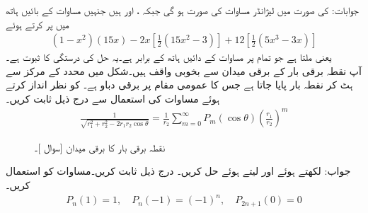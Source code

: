 جوابات: کی صورت میں لیژانڈر مساوات  کی صورت  ہو گی جبکہ
 ،  اور  ہیں جنہیں مساوات کے بائیں ہاتھ میں پر کرتے ہوئے
\begin{align*}
(1-x^2)(15x)-2x[\tfrac{1}{2}(15x^2-3)]+12[\tfrac{1}{2}(5x^3-3x)]
\end{align*}
 یعنی  ملتا ہے جو تمام  پر مساوات کے دائیں ہاتھ کے برابر ہے۔یہ حل کی درستگی کا ثبوت ہے۔
\quad {}\\
آپ نقطہ برقی بار کے برقی میدان سے بخوبی واقف ہیں۔شکل  میں محدد کے مرکز  سے ہٹ کر نقطہ بار  پایا جاتا ہے جس کا عمومی مقام  پر برقی دباو
  ہے۔ کو نظر انداز کرتے ہوئے مساوات  کی استعمال سے  درج ذیل ثابت کریں۔
\begin{align}
\frac{1}{\sqrt{r_1^2+r_2^2-2r_1r_2\cos \theta}}=\frac{1}{r_2}\sum_{m=0}^{\infty} P_m(\cos \theta) \left(\frac{r_1}{r_2}\right)^m
\end{align}
%
\begin{figure}
\centering
{}
\caption{نقطہ برقی بار کا برقی میدان [سوال ]۔}
\label{شکل_بیسل_نقطہ_بار_میدان}
\end{figure}
%
جواب: لکھتے ہوئے  اور  لیتے ہوئے حل کریں۔
\quad 
درج ذیل ثابت کریں۔مساوات  کو استعمال کریں۔
\begin{align*}
P_n(1)=1,\quad P_n(-1)=(-1)^n,\quad P_{2n+1}(0)=0
\end{align*}
\\
